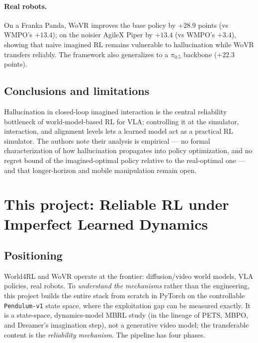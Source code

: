 \documentclass[11pt]{article}
\begin{document}
\paragraph{Real robots.} On a Franka Panda, WoVR improves the base policy by $+28.9$ points (vs WMPO's
$+13.4$); on the noisier AgileX Piper by $+13.4$ (vs WMPO's $+3.4$), showing that naive imagined RL
remains vulnerable to hallucination while WoVR transfers reliably. The framework also generalizes to a
$\pi_{0.5}$ backbone ($+22.3$ points).

\subsection{Conclusions and limitations}
Hallucination in closed-loop imagined interaction is the central reliability bottleneck of
world-model-based RL for VLA; controlling it at the simulator, interaction, and alignment levels lets a
learned model act as a practical RL simulator. The authors note their analysis is empirical --- no formal
characterization of how hallucination propagates into policy optimization, and no regret bound of the
imagined-optimal policy relative to the real-optimal one --- and that longer-horizon and mobile
manipulation remain open.

\section{This project: Reliable RL under Imperfect Learned Dynamics}
\subsection{Positioning}
World4RL and WoVR operate at the frontier: diffusion/video world models, VLA policies, real robots. To
\emph{understand the mechanisms} rather than the engineering, this project builds the entire stack from
scratch in PyTorch on the controllable \texttt{Pendulum-v1} state space, where the exploitation gap can
be measured exactly. It is a state-space, dynamics-model MBRL study (in the lineage of PETS, MBPO, and
Dreamer's imagination step), not a generative video model; the transferable content is the
\emph{reliability mechanism}. The pipeline has four phases.
\end{document}
